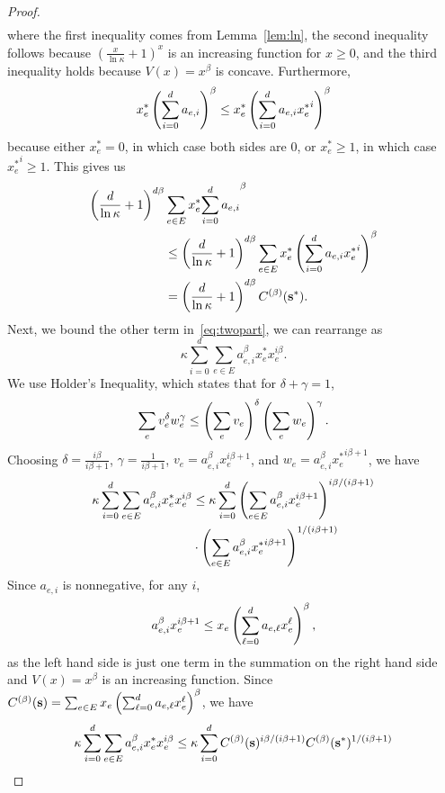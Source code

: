 \documentclass[twoside]{article}
\begin{document}
\begin{multicols}{2}
\begin{proof}
\begin{align*}
  \end{align*}
  where the first inequality comes from Lemma~\ref{lem:ln}, the second inequality
  follows because $(\frac{x}{\ln \kappa} + 1)^x$ is an increasing function for
  $x \ge 0$, and the third inequality holds because $V(x) = x^\beta$ is concave.
  Furthermore,
  \[
    x_e^* \left(\sum_{i=0}^d a_{e,i}\right)^\beta \le x_e^* \left(\sum_{i=0}^d a_{e,i}
    {x_e^*}^i\right)^\beta
  \]
  because either $x_e^* = 0$, in which case both sides are 0, or $x_e^* \ge 1$,
  in which case ${x_e^*}^i \ge 1$. This gives us
  \begin{align*}
    \left(\frac{d}{\ln \kappa} + 1\right)^{d\beta} &\sum_{e \in E} x_e^* {\sum_{i=0}^d
    a_{e,i}}^\beta \\
    &\le \left(\frac{d}{\ln \kappa} + 1\right)^{d\beta} \sum_{e \in E}
    x_e^* \left(\sum_{i=0}^d a_{e,i}
    {x_e^*}^i\right)^\beta \\
    &= \left(\frac{d}{\ln \kappa} + 1\right)^{d\beta} C^{(\beta)}(\mathbf{s}^*).
  \end{align*}
  Next, we bound the other term in~\eqref{eq:twopart}, we can rearrange as
  \[
    \kappa\sum_{i=0}^d \sum_{e \in E} a_{e,i}^\beta x_e^* x_e^{i\beta}.
  \]
  We use Holder's Inequality, which states that for $\delta + \gamma = 1$,
  \[
    \sum_e v_e^\delta w_e^\gamma \le \left(\sum_e v_e\right)^\delta \left(\sum_e w_e\right)^\gamma.
  \]
  Choosing $\delta = \frac{i\beta}{i\beta + 1}$, $\gamma = \frac{1}{i\beta +
  1}$, $v_e = a_{e,i}^\beta x_e^{i\beta + 1}$, and $w_e = a_{e,i}^\beta
  {x_e^*}^{i\beta + 1}$, we have
  \begin{align*}
    \kappa\sum_{i=0}^d \sum_{e \in E} a_{e,i}^\beta x_e^* x_e^{i\beta} &\le
    \kappa \sum_{i=0}^d \left(\sum_{e \in E} a_{e,i}^\beta x_e^{i\beta +
    1}\right)^{i\beta/(i\beta+1)} \\
    &\cdot \left(\sum_{e \in E} a_{e,i}^\beta {x_e^*}^{i\beta +
    1}\right)^{1/(i\beta+1)}
  \end{align*}
  Since $a_{e,i}$ is nonnegative, for any $i$,
  \[
    a_{e,i}^\beta x_e^{i\beta+1} \le x_e \left(\sum_{\ell=0}^d a_{e,\ell}
    x_e^{\ell}\right)^\beta,
  \]
  as the left hand side is just one term in the summation on the right hand
  side and $V(x) = x^\beta$ is an increasing function. Since $C^{(\beta)}(\mathbf{s}) =
  \sum_{e \in E} x_e \left(\sum_{\ell=0}^d a_{e,\ell} x_e^\ell\right)^\beta$, we have
  \begin{align*}
    \kappa\sum_{i=0}^d \sum_{e \in E} a_{e,i}^\beta x_e^* x_e^{i\beta} &\le
    \kappa \sum_{i=0}^d C^{(\beta)}(\mathbf{s})^{i\beta/(i\beta+1)}
    C^{(\beta)}(\mathbf{s}^*)^{1/(i\beta+1)} \\
  \end{align*}

\end{proof}
\end{multicols}
\end{document}
